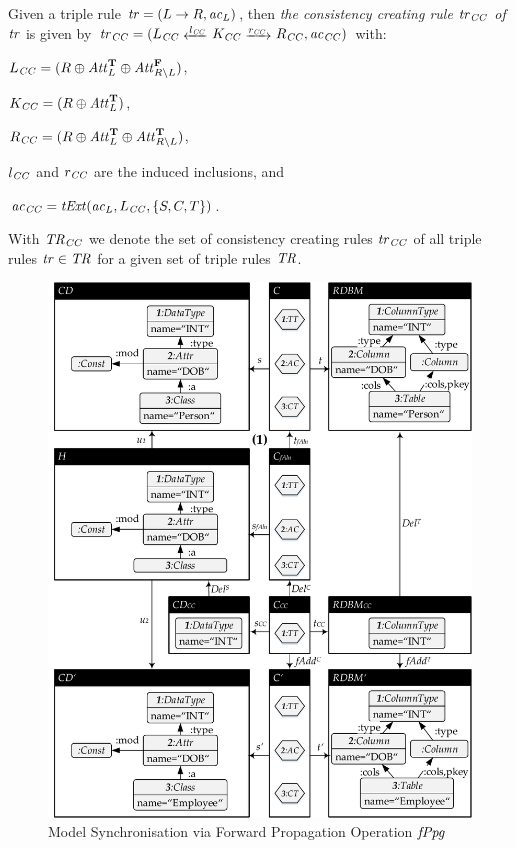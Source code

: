 \begin{definition}
\label{def:sec-msynch-tgg:cc_rule}
Given a triple rule $\mathit{tr}=(L \to R,\mathit{ac}_L)$, then \emph{the consistency creating rule $\mathit{tr}_\mathit{CC}$ of $\mathit{tr}$} is given by $\tr_\CC=(L_\CC \transB{l_\CC} K_\CC \trans{r_\CC} R_\CC,\ac_\CC)$ with:
\begin{enumerate*}
  \item $L_\mathit{CC}=(R \oplus \mathit{Att}^\mathbf{T}_L \oplus \mathit{Att}^\mathbf{F}_{R \setminus L})$,
  \item $K_\mathit{CC}=(R \oplus \mathit{Att}^\mathbf{T}_L)$,
  \item $R_\mathit{CC}=(R \oplus \mathit{Att}^\mathbf{T}_L \oplus \mathit{Att}^\mathbf{T}_{R \setminus L})$,
  \item $l_\mathit{CC}$ and $r_\mathit{CC}$ are the induced inclusions, and
  \item $\mathit{ac}_\mathit{CC}=\mathit{tExt}(\mathit{ac}_L,L_\mathit{CC},\{S,C,T\})$.
\end{enumerate*}
With $\mathit{TR}_\mathit{CC}$ we denote the set of consistency creating rules $\mathit{tr}_\mathit{CC}$ of all triple rules $\mathit{tr} \in \mathit{TR}$ for a given set of triple rules $\mathit{TR}$.
\envEndMarker
\end{definition}

\begin{figure}[!tb]
\begin{center}
\includegraphics[width=.85\textwidth]{img/gen_intro/sync.pdf}
\end{center}
\caption{Model Synchronisation via Forward Propagation Operation $\mathit{fPpg}$}
\label{fig:sec-msynch-tgg:fwd}
\end{figure}

